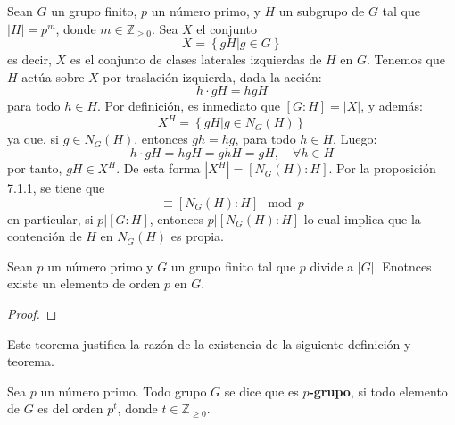 \documentclass[12pt]{report}
\theoremstyle{largebreak}
\begin{document}
    \begin{exa}
        Sean $G$ un grupo finito, $p$ un número primo, y $H$ un subgrupo de $G$ tal que $|H|=p^m$, donde $m\in\mathbb{Z}_{\geq0}$. Sea $X$ el conjunto
        \begin{equation*}
            X=\left\{gH| g\in G \right\}
        \end{equation*}
        es decir, $X$ es el conjunto de clases laterales izquierdas de $H$ en $G$. Tenemos que $H$ actúa sobre $X$ por traslación izquierda, dada la acción:
        \begin{equation*}
            h\cdot gH = hgH
        \end{equation*}
        para todo $h\in H$. Por definición, es inmediato que $\left[G:H\right]=|X|$, y además:
        \begin{equation*}
            X^H=\left\{gH|g\in N_G\left(H\right) \right\}
        \end{equation*}
        ya que, si $g\in N_G\left(H\right)$, entonces $gh=hg$, para todo $h\in H$. Luego:
        \begin{equation*}
            h\cdot gH = hgH=ghH=gH,\quad\forall h\in H
        \end{equation*}
        por tanto, $gH\in X^H$. De esta forma $|X^H|=[N_G(H):H]$. Por la proposición 7.1.1, se tiene que
        \begin{equation*}
            [G:H]\equiv[N_G(H):H]\mod p
        \end{equation*}
        en particular, si $p|[G:H]$, entonces $p|[N_G(H):H]$ lo cual implica que la contención de $H$ en $N_G(H)$ es propia.
    \end{exa}

    \begin{theor}
        Sean $p$ un número primo y $G$ un grupo finito tal que $p$ divide a $|G|$. Enotnces existe un elemento de orden $p$ en $G$.
    \end{theor}

    \begin{proof}
        
    \end{proof}

    Este teorema justifica la razón de la existencia de la siguiente definición y teorema.

    \begin{mydef}
        Sea $p$ un número primo. Todo grupo $G$ se dice que es \textbf{$p$-grupo}, si todo elemento de $G$ es del orden $p^t$, donde $t\in\mathbb{Z}_{\geq0}$.
    \end{mydef}
\end{document}
